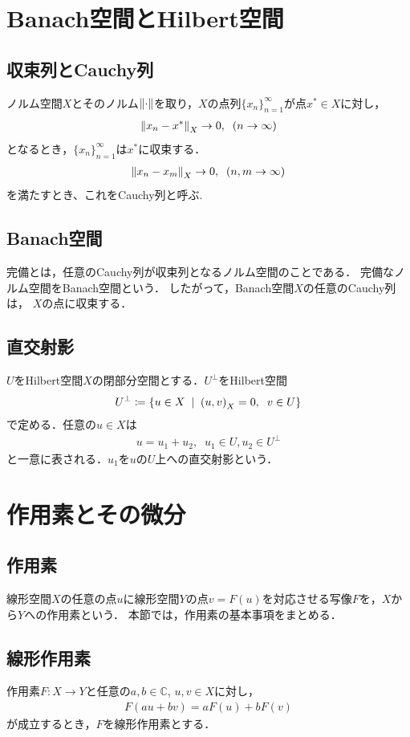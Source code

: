 \section{Banach空間とHilbert空間}

\subsection{収束列とCauchy列}
ノルム空間\(X\)とそのノルム\(\norm{\cdot}\)を取り，\(X\)の点列\(\{x_n\}^{\infty}_{n=1}\)が点\(x^*\in X\)に対し，
\begin{align}
  \norm{x_n-x^*}_X\rightarrow 0,\;\;(n\rightarrow \infty)
\end{align}
となるとき，\(\{x_n\}^{\infty}_{n=1}\)は\(x^*\)に収束する．
\begin{align}
  \norm{x_n-x_m}_X\rightarrow 0,\;\;(n,m\rightarrow \infty)
\end{align}
を満たすとき、これをCauchy列と呼ぶ.
\subsection{Banach空間}%
完備とは，任意のCauchy列が収束列となるノルム空間のことである．
完備なノルム空間をBanach空間という．
したがって，Banach空間\(X\)の任意のCauchy列は，
\(X\)の点に収束する．
\subsection{直交射影}
\(U\)をHilbert空間\(X\)の閉部分空間とする．\(U^\bot\)をHilbert空間
\begin{align}
    U^{\bot} \coloneqq \qty{u\in X\;\;|\;\;\qty(u,v)_X=0, \;\;v\in U}
\end{align}
で定める．任意の\(u\in X\)は
\begin{align}
    u=u_1+u_2, \;\; u_1\in U,u_2\in U^\bot
\end{align}
と一意に表される．\(u_1\)を\(u\)の\(U\)上への直交射影という．
\newpage
\section{作用素とその微分}

\subsection{作用素}
線形空間\(X\)の任意の点\(u\)に線形空間\(Y\)の点\(v=F(u)\)を対応させる写像\(F\)を，\(X\)から\(Y\)への作用素という．
本節では，作用素の基本事項をまとめる．
\subsection{線形作用素}
作用素\(F:X\rightarrow Y\)と任意の\(a,b\in \mathbb{C}\), \(u,v\in X\)に対し，
\begin{align}
    F(au+bv)=aF(u)+bF(v)
\end{align}
が成立するとき，\(F\)を線形作用素とする．

